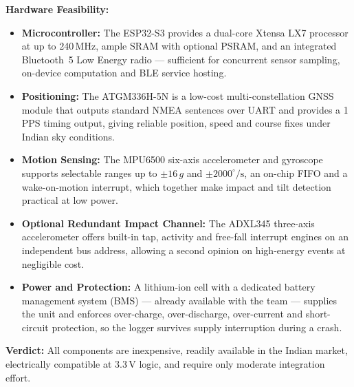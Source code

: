 \documentclass[12pt,a4paper,oneside]{report}
\newcommand{\SI}[2]{#1\,#2}
\newcommand{\verdict}[1]{\par\noindent\textbf{Verdict:} #1\par}
\begin{document}
\noindent\hspace{0.6em}{\large\bfseries (i) TECHNICAL FEASIBILITY}\par
\vspace{0.4em}
\noindent\hspace{0.6em}\textbf{Hardware Feasibility:}
\begin{itemize}[leftmargin=*,itemsep=0.35em,topsep=0.5em]
\item \textbf{Microcontroller:} The ESP32-S3 provides a dual-core Xtensa LX7 processor at up
to \SI{240}{MHz}, ample SRAM with optional PSRAM, and an integrated Bluetooth~5 Low Energy
radio --- sufficient for concurrent sensor sampling, on-device computation and BLE service
hosting.

\item \textbf{Positioning:} The ATGM336H-5N is a low-cost multi-constellation GNSS module
that outputs standard NMEA sentences over UART and provides a 1\,PPS timing output, giving
reliable position, speed and course fixes under Indian sky conditions.

\item \textbf{Motion Sensing:} The MPU6500 six-axis accelerometer and gyroscope supports
selectable ranges up to $\pm 16\,g$ and $\pm 2000^{\circ}/\mathrm{s}$, an on-chip
FIFO and a wake-on-motion interrupt, which together make impact and tilt detection
practical at low power.

\item \textbf{Optional Redundant Impact Channel:} The ADXL345 three-axis accelerometer
offers built-in tap, activity and free-fall interrupt engines on an independent bus address,
allowing a second opinion on high-energy events at negligible cost.

\item \textbf{Power and Protection:} A lithium-ion cell with a dedicated battery management
system (BMS) --- already available with the team --- supplies the unit and enforces
over-charge, over-discharge, over-current and short-circuit protection, so the logger
survives supply interruption during a crash.
\end{itemize}
\verdict{All components are inexpensive, readily available in the Indian market,
electrically compatible at \SI{3.3}{V} logic, and require only moderate integration effort.}
\end{document}
